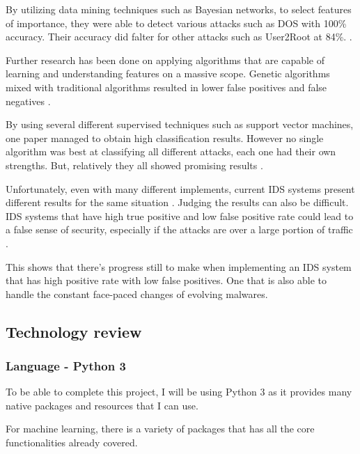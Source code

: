\documentclass[11pt]{article}
\begin{document}
By utilizing data mining techniques such as Bayesian networks, to select features of importance, they were able to detect various attacks such as DOS with 100\% accuracy. Their accuracy did falter for other attacks such as User2Root at 84\%. \cite{related-work-main-approaches}.

Further research has been done on applying algorithms that are capable of learning and understanding features on a massive scope. Genetic algorithms mixed with traditional algorithms resulted in lower false positives and false negatives \cite{related-work-criticise-signature}. 

By using several different supervised techniques such as support vector machines, one paper managed to obtain high classification results. However no single algorithm was best at classifying all different attacks, each one had their own strengths. But, relatively they all showed promising results \cite{related-work-supe}. 

Unfortunately, even with many different implements, current IDS systems present different results for the same situation \cite{related-work-advantages-and-disadvantages}. Judging the results can also be difficult. IDS systems that have high true positive and low false positive rate could lead to a false sense of security, especially if the attacks are over a large portion of traffic \cite{related-work-advantages-and-disadvantages}.

This shows that there’s progress still to make when implementing an IDS system that has high positive rate with low false positives. One that is also able to handle the constant face-paced changes of evolving malwares.

\subsection{Technology review}
\subsubsection{Language - Python 3}
To be able to complete this project, I will be using Python 3 as it provides many native packages and resources that I can use.

For machine learning, there is a variety of packages that has all the core functionalities already covered.
\end{document}
